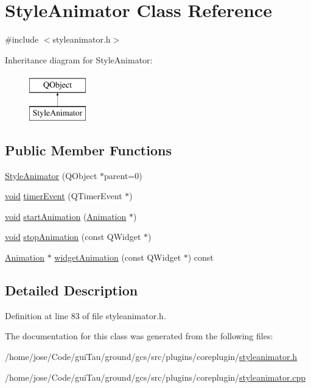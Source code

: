 \hypertarget{class_style_animator}{\section{Style\-Animator Class Reference}
\label{class_style_animator}
}


{\ttfamily \#include $<$styleanimator.\-h$>$}

Inheritance diagram for Style\-Animator\-:\begin{figure}[H]
\begin{center}
\leavevmode
\includegraphics[height=2.000000cm]{class_style_animator}
\end{center}
\end{figure}
\subsection*{Public Member Functions}
\begin{DoxyCompactItemize}
\item 
\hyperlink{group___core_plugin_ga44d3b0990bed81996b397c617e80d487}{Style\-Animator} (Q\-Object $\ast$parent=0)
\item 
\hyperlink{group___u_a_v_objects_plugin_ga444cf2ff3f0ecbe028adce838d373f5c}{void} \hyperlink{group___core_plugin_ga8b1efe3a3fd1210cf5d02289e043c269}{timer\-Event} (Q\-Timer\-Event $\ast$)
\item 
\hyperlink{group___u_a_v_objects_plugin_ga444cf2ff3f0ecbe028adce838d373f5c}{void} \hyperlink{group___core_plugin_gae27ca068cc3b68f67b3085e5ff68d975}{start\-Animation} (\hyperlink{class_animation}{Animation} $\ast$)
\item 
\hyperlink{group___u_a_v_objects_plugin_ga444cf2ff3f0ecbe028adce838d373f5c}{void} \hyperlink{group___core_plugin_ga7f761734b2694f2b47f29ec5f033140f}{stop\-Animation} (const Q\-Widget $\ast$)
\item 
\hyperlink{class_animation}{Animation} $\ast$ \hyperlink{group___core_plugin_ga952d425bf52fae5cd5bd54712cd27d82}{widget\-Animation} (const Q\-Widget $\ast$) const 
\end{DoxyCompactItemize}


\subsection{Detailed Description}


Definition at line 83 of file styleanimator.\-h.



The documentation for this class was generated from the following files\-:\begin{DoxyCompactItemize}
\item 
/home/jose/\-Code/gui\-Tau/ground/gcs/src/plugins/coreplugin/\hyperlink{styleanimator_8h}{styleanimator.\-h}\item 
/home/jose/\-Code/gui\-Tau/ground/gcs/src/plugins/coreplugin/\hyperlink{styleanimator_8cpp}{styleanimator.\-cpp}\end{DoxyCompactItemize}
